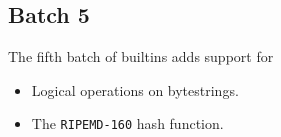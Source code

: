 \renewcommand{\note}[1]{
  \bigskip
  \refstepcounter{notenumberE}
  \noindent\textbf{Note \thenotenumberE. #1}
}

\subsection{Batch 5}
\label{sec:default-builtins-5}
The fifth batch of builtins adds support for
\begin{itemize}
\item Logical operations on bytestrings.
\item The \texttt{RIPEMD-160} hash function.
\end{itemize}


